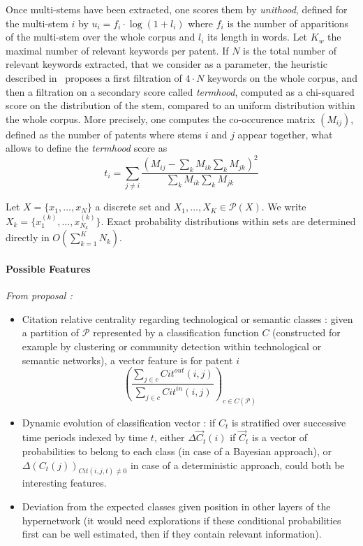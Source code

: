 Once multi-stems have been extracted, one scores them by \emph{unithood}, defined for the multi-stem $i$ by $u_i = f_i\cdot \log{(1 + l_i)}$ where $f_i$ is the number of apparitions of the multi-stem over the whole corpus and $l_i$ its length in words. Let $K_w$ the maximal number of relevant keywords per patent. If $N$ is the total number of relevant keywords extracted, that we consider as a parameter, the heuristic described in~\cite{chavalarias2013phylomemetic} proposes a first filtration of $4\cdot N$ keywords on the whole corpus, and then a filtration on a secondary score called \emph{termhood}, computed as a chi-squared score on the distribution of the stem, compared to an uniform distribution within the whole corpus. More precisely, one computes the co-occurence matrix $(M_{ij})$, defined as the number of patents where stems $i$ and $j$ appear together, what allows to define the \emph{termhood} score as
\[
t_i = \sum_{j\neq i}\frac{\left( M_{ij} - \sum_{k}M_{ik} \sum_{k} M_{jk}\right)^2}{\sum_{k}M_{ik} \sum_{k} M_{jk}}
\]






Let $X = \{x_1,\ldots ,x_N\}$ a discrete set and $X_1,\ldots ,X_K \in \mathcal{P}(X)$. We write $X_k = \{x_1^{(k)},\ldots ,x_{N_k}^{(k)}\}$. Exact probability distributions within sets are determined directly in $O(\sum_{k=1}^{K}{N_k})$.





\paragraph{Possible Features}

\textit{From proposal : }

\begin{itemize}
\item Citation relative centrality regarding technological or semantic classes : given a partition of $\mathcal{P}$ represented by a classification function $C$ (constructed for example by clustering or community detection within technological or semantic networks), a vector feature is for patent $i$
\[
\left(\frac{\sum_{j\in c}Cit^{out}(i,j)}{\sum_{j\in c}Cit^{in}(i,j)}\right)_{c\in C(\mathcal{P})}
\]
\item Dynamic evolution of classification vector : if $C_t$ is stratified over successive time periods indexed by time $t$, either $\Delta \vec{C}_t (i)$ if $\vec{C}_t$ is a vector of probabilities to belong to each class (in case of a Bayesian approach), or $\Delta (C_t(j))_{Cit(i,j,t)\neq 0}$ in case of a deterministic approach, could both be interesting features.
\item Deviation from the expected classes given position in other layers of the hypernetwork (it would need explorations if these conditional probabilities first can be well estimated, then if they contain relevant information).
\end{itemize}






